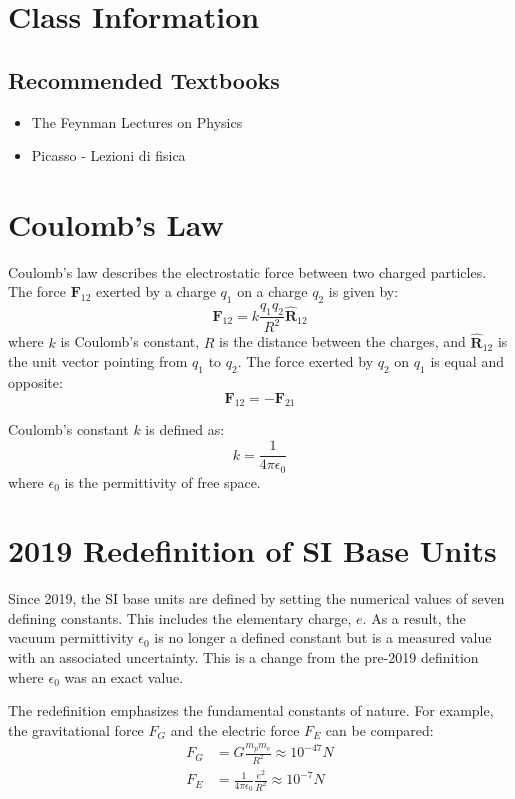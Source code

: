 \section*{Class Information}

\subsection*{Recommended Textbooks}
\begin{itemize}
    \item The Feynman Lectures on Physics
    \item Picasso - Lezioni di fisica
\end{itemize}

\section{Coulomb's Law}

Coulomb's law describes the electrostatic force between two charged particles. The force $\mathbf{F}_{12}$ exerted by a charge $q_1$ on a charge $q_2$ is given by:
\begin{equation}
    \mathbf{F}_{12} = k \frac{q_1 q_2}{R^2} \hat{\mathbf{R}}_{12}
\end{equation}
where $k$ is Coulomb's constant, $R$ is the distance between the charges, and $\hat{\mathbf{R}}_{12}$ is the unit vector pointing from $q_1$ to $q_2$. The force exerted by $q_2$ on $q_1$ is equal and opposite:
\begin{equation}
    \mathbf{F}_{12} = -\mathbf{F}_{21}
\end{equation}

Coulomb's constant $k$ is defined as:
\begin{equation}
    k = \frac{1}{4\pi\epsilon_0}
\end{equation}
where $\epsilon_0$ is the permittivity of free space.

\section{2019 Redefinition of SI Base Units}

Since 2019, the SI base units are defined by setting the numerical values of seven defining constants. This includes the elementary charge, $e$. As a result, the vacuum permittivity $\epsilon_0$ is no longer a defined constant but is a measured value with an associated uncertainty. This is a change from the pre-2019 definition where $\epsilon_0$ was an exact value.

The redefinition emphasizes the fundamental constants of nature. For example, the gravitational force $F_G$ and the electric force $F_E$ can be compared:
\begin{align}
    F_G &= G \frac{m_p m_e}{R^2} \approx 10^{-47} N \\
    F_E &= \frac{1}{4\pi\epsilon_0} \frac{e^2}{R^2} \approx 10^{-7} N
\end{align}
